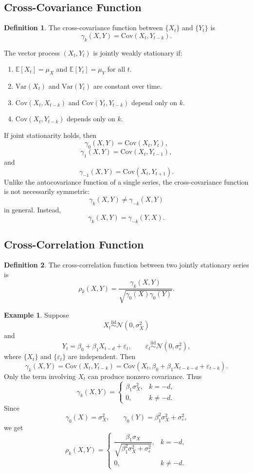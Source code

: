 \documentclass[12pt,oneside]{book}
\numberwithin{equation}{section}
\theoremstyle{definition}
\newtheorem{definition}{Definition}[section]
\newtheorem{example}{Example}[section]
\theoremstyle{plain}
\theoremstyle{remark}
\newcommand{\E}{\mathbb{E}}
\newcommand{\Var}{\mathrm{Var}}
\newcommand{\Cov}{\mathrm{Cov}}
\newcommand{\iid}{\overset{\text{iid}}{\sim}}
\newcommand{\Normal}{\mathcal{N}}
\begin{document}
\subsection{Cross-Covariance Function}

\begin{definition}
The cross-covariance function between $\{X_t\}$ and $\{Y_t\}$ is
\[
\gamma_k(X,Y)
=
\Cov(X_t,Y_{t-k}).
\]
\end{definition}

The vector process $(X_t,Y_t)$ is jointly weakly stationary if:

\begin{enumerate}
\item $\E[X_t]=\mu_X$ and $\E[Y_t]=\mu_Y$ for all $t$.
\item $\Var(X_t)$ and $\Var(Y_t)$ are constant over time.
\item $\Cov(X_t,X_{t-k})$ and $\Cov(Y_t,Y_{t-k})$ depend only on $k$.
\item $\Cov(X_t,Y_{t-k})$ depends only on $k$.
\end{enumerate}

If joint stationarity holds, then
\[
\gamma_0(X,Y)=\Cov(X_t,Y_t),
\]
\[
\gamma_1(X,Y)=\Cov(X_t,Y_{t-1}),
\]
and
\[
\gamma_{-1}(X,Y)=\Cov(X_t,Y_{t+1}).
\]
Unlike the autocovariance function of a single series, the cross-covariance function is not necessarily symmetric:
\[
\gamma_k(X,Y)
\neq
\gamma_{-k}(X,Y)
\]
in general. Instead,
\[
\gamma_k(X,Y)=\gamma_{-k}(Y,X).
\]

\subsection{Cross-Correlation Function}

\begin{definition}
The cross-correlation function between two jointly stationary series is
\[
\rho_k(X,Y)
=
\frac{\gamma_k(X,Y)}
{\sqrt{\gamma_0(X)\gamma_0(Y)}}.
\]
\end{definition}

\begin{example}
Suppose
\[
X_t\iid \Normal(0,\sigma_X^2)
\]
and
\[
Y_t=\beta_0+\beta_1X_{t-d}+\varepsilon_t,
\qquad
\varepsilon_t\iid \Normal(0,\sigma_\varepsilon^2),
\]
where $\{X_t\}$ and $\{\varepsilon_t\}$ are independent. Then
\[
\gamma_k(X,Y)
=
\Cov(X_t,Y_{t-k})
=
\Cov(X_t,\beta_0+\beta_1X_{t-k-d}+\varepsilon_{t-k}).
\]
Only the term involving $X_t$ can produce nonzero covariance. Thus
\[
\gamma_k(X,Y)
=
\begin{cases}
\beta_1\sigma_X^2, & k=-d,\\
0, & k\neq -d.
\end{cases}
\]
Since
\[
\gamma_0(X)=\sigma_X^2,
\qquad
\gamma_0(Y)=\beta_1^2\sigma_X^2+\sigma_\varepsilon^2,
\]
we get
\[
\rho_k(X,Y)
=
\begin{cases}
\dfrac{\beta_1\sigma_X}{\sqrt{\beta_1^2\sigma_X^2+\sigma_\varepsilon^2}}, & k=-d,\\
0, & k\neq -d.
\end{cases}
\]
\end{example}
\end{document}
